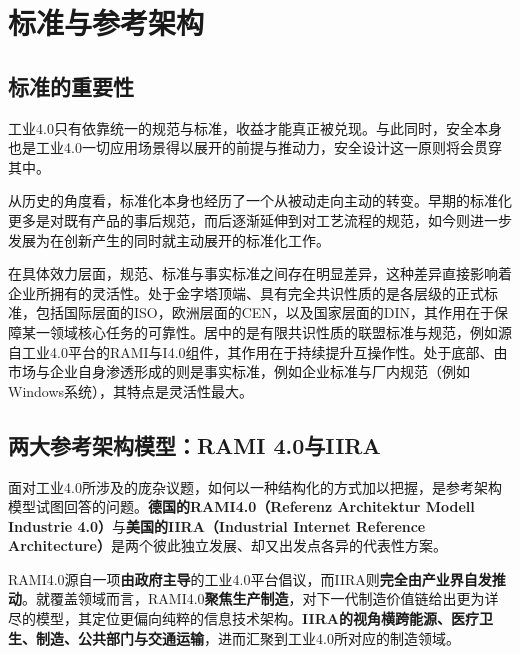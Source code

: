 \section{标准与参考架构}

\subsection{标准的重要性}

工业4.0只有依靠统一的规范与标准，收益才能真正被兑现。与此同时，安全本身也是工业4.0一切应用场景得以展开的前提与推动力，安全设计这一原则将会贯穿其中。

从历史的角度看，标准化本身也经历了一个从被动走向主动的转变。早期的标准化更多是对既有产品的事后规范，而后逐渐延伸到对工艺流程的规范，如今则进一步发展为在创新产生的同时就主动展开的标准化工作。

在具体效力层面，规范、标准与事实标准之间存在明显差异，这种差异直接影响着企业所拥有的灵活性。处于金字塔顶端、具有完全共识性质的是各层级的正式标准，包括国际层面的ISO，欧洲层面的CEN，以及国家层面的DIN，其作用在于保障某一领域核心任务的可靠性。居中的是有限共识性质的联盟标准与规范，例如源自工业4.0平台的RAMI与I4.0组件，其作用在于持续提升互操作性。处于底部、由市场与企业自身渗透形成的则是事实标准，例如企业标准与厂内规范（例如Windows系统），其特点是灵活性最大。

\subsection{两大参考架构模型：RAMI 4.0与IIRA}

面对工业4.0所涉及的庞杂议题，如何以一种结构化的方式加以把握，是参考架构模型试图回答的问题。\textbf{德国的RAMI4.0（Referenz Architektur Modell Industrie 4.0）}与\textbf{美国的IIRA（Industrial Internet Reference Architecture）}是两个彼此独立发展、却又出发点各异的代表性方案。

RAMI4.0源自一项\textbf{由政府主导}的工业4.0平台倡议，而IIRA则\textbf{完全由产业界自发推动}。就覆盖领域而言，RAMI4.0\textbf{聚焦生产制造}，对下一代制造价值链给出更为详尽的模型，其定位更偏向纯粹的信息技术架构。\textbf{IIRA的视角横跨能源、医疗卫生、制造、公共部门与交通运输}，进而汇聚到工业4.0所对应的制造领域。

